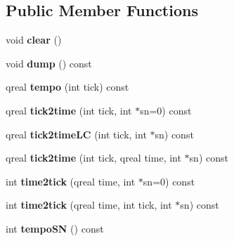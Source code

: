 \subsection*{Public Member Functions}
\begin{DoxyCompactItemize}
\item 
\mbox{\label{class_ms_1_1_tempo_map_a49fd05a248bc994ac50d38f16941f754}} 
void {\bfseries clear} ()
\item 
\mbox{\label{class_ms_1_1_tempo_map_a268399daed48cc5002555646a9d866ef}} 
void {\bfseries dump} () const
\item 
\mbox{\label{class_ms_1_1_tempo_map_a75b2876d1d76d2433457f335f4d5d159}} 
qreal {\bfseries tempo} (int tick) const
\item 
\mbox{\label{class_ms_1_1_tempo_map_a6c50ffc471c5bf4fe9ea572fe7ddb0f4}} 
qreal {\bfseries tick2time} (int tick, int $\ast$sn=0) const
\item 
\mbox{\label{class_ms_1_1_tempo_map_afc79af36c266d27576721265c0a4083b}} 
qreal {\bfseries tick2time\+LC} (int tick, int $\ast$sn) const
\item 
\mbox{\label{class_ms_1_1_tempo_map_ab99f9b0d40ddce500d7f0ce2b055a1ec}} 
qreal {\bfseries tick2time} (int tick, qreal time, int $\ast$sn) const
\item 
\mbox{\label{class_ms_1_1_tempo_map_afdef6bb5a26aa9e097d1bd22360eb298}} 
int {\bfseries time2tick} (qreal time, int $\ast$sn=0) const
\item 
\mbox{\label{class_ms_1_1_tempo_map_abb182a0a32d6cc9ec732bbfdec5572f7}} 
int {\bfseries time2tick} (qreal time, int tick, int $\ast$sn) const
\item 
\mbox{\label{class_ms_1_1_tempo_map_a8689369ef09a73c46a5c86662ef9314b}} 
int {\bfseries tempo\+SN} () const
\item 
\mbox{\label{class_ms_1_1_tempo_map_a83aa31ac5334839f077efe68b875fee0}} 

\end{DoxyCompactItemize}
